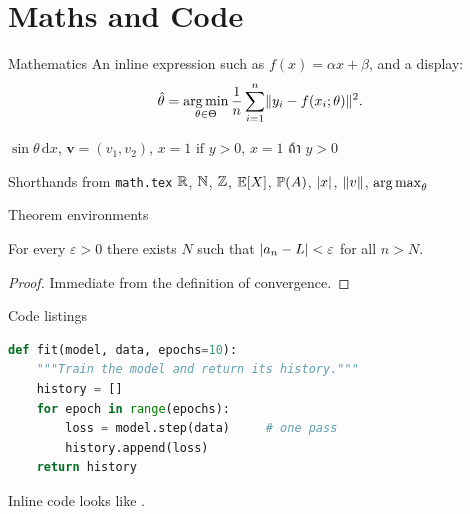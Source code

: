 \section{Maths and Code}

\begin{frame}{Mathematics}
  An inline expression such as $f(x) = \alpha x + \beta$, and a display:
  \begin{equation}
    \hat{\theta} = \operatorname*{arg\,min}_{\theta \in \Theta}
      \frac{1}{n}\sum_{i=1}^{n} \lVert y_i - f(x_i; \theta)\rVert^2 .
  \end{equation}

  $\sin\theta\,\mathrm{d}x$, \quad $\mathbf{v} = (v_1, v_2)$, \quad
  $x = 1 \text{ if } y > 0$, \quad $x = 1 \text{ ถ้า } y > 0$

  \begin{block}{Shorthands from \texttt{math.tex}}
    $\mathbb{R}$, $\mathbb{N}$, $\mathbb{Z}$, $\mathbb{E}[X]$, $\mathbb{P}(A)$, $\lvert x\rvert$, $\lVert v\rVert$,
    $\operatorname*{arg\,max}_\theta$
  \end{block}
\end{frame}

\begin{frame}{Theorem environments}
  \begin{theorem}
    For every $\varepsilon > 0$ there exists $N$ such that
    $\lvert a_n - L\rvert < \varepsilon$ for all $n > N$.
  \end{theorem}

  \begin{proof}
    Immediate from the definition of convergence.
  \end{proof}
\end{frame}

\begin{frame}[fragile]{Code listings}
\begin{lstlisting}[language=Python]
def fit(model, data, epochs=10):
    """Train the model and return its history."""
    history = []
    for epoch in range(epochs):
        loss = model.step(data)     # one pass
        history.append(loss)
    return history
\end{lstlisting}

  Inline code looks like .
\end{frame}
